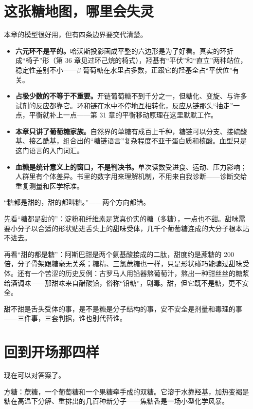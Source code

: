 \section{这张糖地图，哪里会失灵}

本章的模型很好用，但有四条边界要交代清楚。

\begin{itemize}[itemsep=2pt]
\item \textbf{六元环不是平的。}哈沃斯投影画成平整的六边形是为了好看。真实的环折成“椅子”形（第 36 章见过环己烷的椅式），羟基有“平伏”和“直立”两种站位，稳定性差别不小——$\beta$ 葡萄糖在水里占多数，正跟它的羟基全占“平伏位”有关。
\item \textbf{占极少数的不等于不重要。}开链葡萄糖不到千分之一，但糖化、变旋、与许多试剂的反应都靠它。环和链在水中不停地互相转化，反应从链那头“抽走”一点，平衡就补上一点——第 31 章的平衡移动原理在这里默默工作。
\item \textbf{本章只讲了葡萄糖家族。}自然界的单糖有成百上千种，糖链可以分支、接硫酸基、接乙酰基，组合出的“糖链语言”复杂程度不亚于蛋白质和核酸。血型只是这门语言的入门词汇。
\item \textbf{血糖是统计意义上的窗口，不是判决书。}单次读数受进食、运动、压力影响；人群里有个体差异。书里的数字用来理解机制，不用来自我诊断——诊断交给重复测量和医学标准。
\end{itemize}

\begin{wuqu}
“糖都是甜的，甜的都叫糖。”——两个方向都错。

先看“糖都是甜的”：淀粉和纤维素是货真价实的糖（多糖），一点也不甜。甜味需要小分子以合适的形状贴进舌头上的甜味受体，几千个葡萄糖连成的大分子根本贴不进去。

再看“甜的都是糖”：阿斯巴甜是两个氨基酸接成的二肽，甜度约是蔗糖的 200 倍，分子骨架跟糖毫无关系；糖精、三氯蔗糖也一样，只是形状碰巧能骗过甜味受体。还有一个苦涩的历史反例：古罗马人用铅器熬葡萄汁，熬出一种甜丝丝的糖浆给酒调味——那甜味来自醋酸铅，俗称“铅糖”，剧毒。甜，但它既不是糖，更不安全。

甜不甜是舌头受体的事，是不是糖是分子结构的事，安不安全是剂量和毒理的事——三件事，三套判据，谁也别代替谁。
\end{wuqu}

\section{回到开场那四样}

现在可以对答案了。

方糖：蔗糖，一个葡萄糖和一个果糖牵手成的双糖。它溶于水靠羟基，加热变褐是糖在高温下分解、重排出的几百种新分子——焦糖香是一场小型化学风暴。

